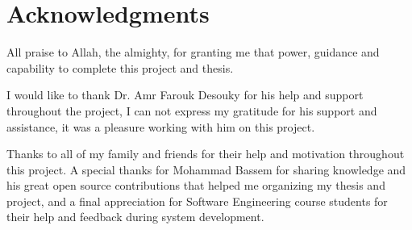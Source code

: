 \chapter*{Acknowledgments}
\label{chap:ack}
All praise to Allah, the almighty, for granting me that power, guidance and capability to complete this project and thesis.

\newParagraph
I would like to thank Dr. Amr Farouk Desouky for his help and support throughout the project, I can not express my
gratitude for his support and assistance, it was a pleasure working with him on this project.

\newParagraph
Thanks to all of my family and friends for their help and motivation throughout this project. A special thanks for Mohammad Bassem for sharing
knowledge and his great open source contributions that helped me organizing my thesis and project, and a final appreciation for Software Engineering course
students for their help and feedback during system development.
